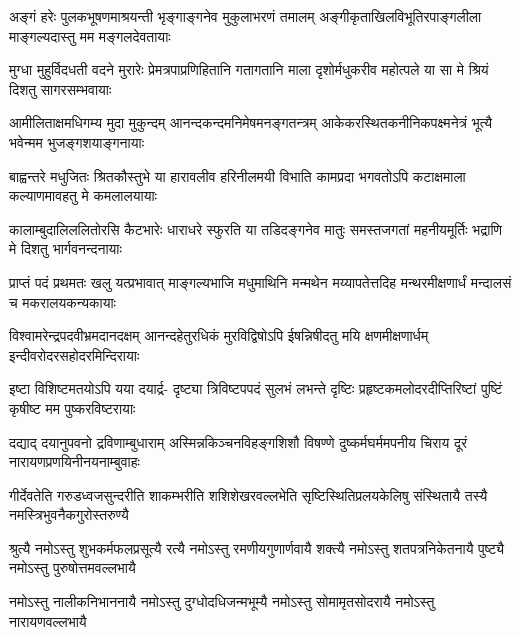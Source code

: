 
\fourlineindentedshloka
{अङ्गं हरेः पुलकभूषणमाश्रयन्ती}
{भृङ्गाङ्गनेव मुकुलाभरणं तमालम्}
{अङ्गीकृताखिलविभूतिरपाङ्गलीला}
{माङ्गल्यदास्तु मम मङ्गलदेवतायाः}

\fourlineindentedshloka
{मुग्धा मुहुर्विदधती वदने मुरारेः}
{प्रेमत्रपाप्रणिहितानि गतागतानि}
{माला दृशोर्मधुकरीव महोत्पले या}
{सा मे श्रियं दिशतु सागरसम्भवायाः}

\fourlineindentedshloka
{आमीलिताक्षमधिगम्य मुदा मुकुन्दम्}
{आनन्दकन्दमनिमेषमनङ्गतन्त्रम्}
{आकेकरस्थितकनीनिकपक्ष्मनेत्रं}
{भूत्यै भवेन्मम भुजङ्गशयाङ्गनायाः}

\fourlineindentedshloka
{बाह्वन्तरे मधुजितः श्रितकौस्तुभे या}
{हारावलीव हरिनीलमयी विभाति}
{कामप्रदा भगवतोऽपि कटाक्षमाला}
{कल्याणमावहतु मे कमलालयायाः}

\fourlineindentedshloka
{कालाम्बुदालिललितोरसि कैटभारेः}
{धाराधरे स्फुरति या तडिदङ्गनेव}
{मातुः समस्तजगतां महनीयमूर्तिः}
{भद्राणि मे दिशतु भार्गवनन्दनायाः}

\fourlineindentedshloka
{प्राप्तं पदं प्रथमतः खलु यत्प्रभावात्}
{माङ्गल्यभाजि मधुमाथिनि मन्मथेन}
{मय्यापतेत्तदिह मन्थरमीक्षणार्धं}
{मन्दालसं च मकरालयकन्यकायाः}

\fourlineindentedshloka
{विश्वामरेन्द्रपदवीभ्रमदानदक्षम्}
{आनन्दहेतुरधिकं मुरविद्विषोऽपि}
{ईषन्निषीदतु मयि क्षणमीक्षणार्धम्}
{इन्दीवरोदरसहोदरमिन्दिरायाः}

\fourlineindentedshloka
{इष्टा विशिष्टमतयोऽपि यया दयार्द्र-}
{दृष्ट्या त्रिविष्टपपदं सुलभं लभन्ते}
{दृष्टिः प्रहृष्टकमलोदरदीप्तिरिष्टां}
{पुष्टिं कृषीष्ट मम पुष्करविष्टरायाः}

\fourlineindentedshloka
{दद्याद् दयानुपवनो द्रविणाम्बुधाराम्}
{अस्मिन्नकिञ्चनविहङ्गशिशौ विषण्णे}
{दुष्कर्मघर्ममपनीय चिराय दूरं}
{नारायणप्रणयिनीनयनाम्बुवाहः}

\fourlineindentedshloka
{गीर्देवतेति गरुडध्वजसुन्दरीति}
{शाकम्भरीति शशिशेखरवल्लभेति}
{सृष्टिस्थितिप्रलयकेलिषु संस्थितायै}
{तस्यै नमस्त्रिभुवनैकगुरोस्तरुण्यै}

\fourlineindentedshloka
{श्रुत्यै नमोऽस्तु शुभकर्मफलप्रसूत्यै}
{रत्यै नमोऽस्तु रमणीयगुणार्णवायै}
{शक्त्यै नमोऽस्तु शतपत्रनिकेतनायै}
{पुष्ट्यै नमोऽस्तु पुरुषोत्तमवल्लभायै}

\fourlineindentedshloka
{नमोऽस्तु नालीकनिभाननायै}
{नमोऽस्तु दुग्धोदधिजन्मभूम्यै}
{नमोऽस्तु सोमामृतसोदरायै}
{नमोऽस्तु नारायणवल्लभायै}

